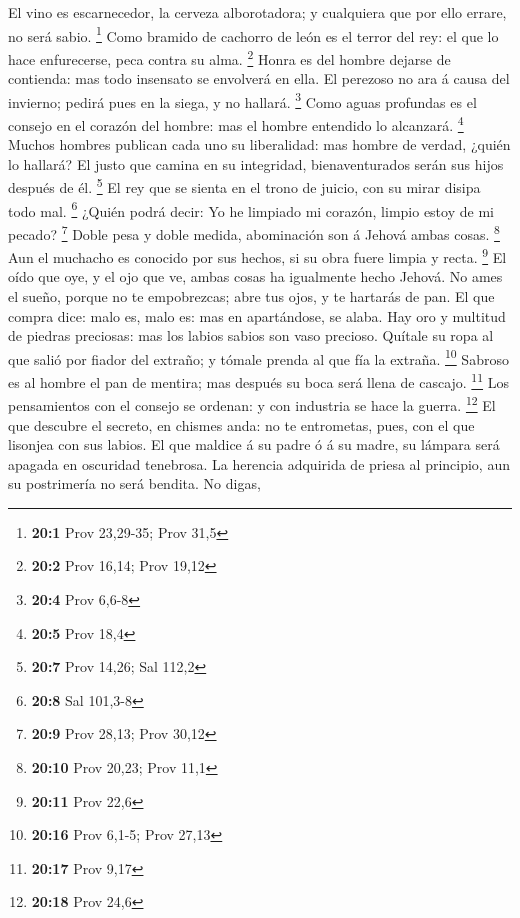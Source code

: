  El vino es escarnecedor, la cerveza alborotadora; y
cualquiera que por ello errare, no será sabio. \footnote{\textbf{20:1}
  Prov 23,29-35; Prov 31,5}  Como bramido de cachorro de
león es el terror del rey: el que lo hace enfurecerse, peca contra su
alma. \footnote{\textbf{20:2} Prov 16,14; Prov 19,12} 
Honra es del hombre dejarse de contienda: mas todo insensato se
envolverá en ella.  El perezoso no ara á causa del
invierno; pedirá pues en la siega, y no hallará. \footnote{\textbf{20:4}
  Prov 6,6-8}  Como aguas profundas es el consejo en el
corazón del hombre: mas el hombre entendido lo alcanzará. \footnote{\textbf{20:5}
  Prov 18,4}  Muchos hombres publican cada uno su
liberalidad: mas hombre de verdad, ¿quién lo hallará?  El
justo que camina en su integridad, bienaventurados serán sus hijos
después de él. \footnote{\textbf{20:7} Prov 14,26; Sal 112,2}
 El rey que se sienta en el trono de juicio, con su mirar
disipa todo mal. \footnote{\textbf{20:8} Sal 101,3-8} 
¿Quién podrá decir: Yo he limpiado mi corazón, limpio estoy de mi
pecado? \footnote{\textbf{20:9} Prov 28,13; Prov 30,12} 
Doble pesa y doble medida, abominación son á Jehová ambas cosas.
\footnote{\textbf{20:10} Prov 20,23; Prov 11,1}  Aun el
muchacho es conocido por sus hechos, si su obra fuere limpia y recta.
\footnote{\textbf{20:11} Prov 22,6}  El oído que oye, y
el ojo que ve, ambas cosas ha igualmente hecho Jehová. 
No ames el sueño, porque no te empobrezcas; abre tus ojos, y te hartarás
de pan.  El que compra dice: malo es, malo es: mas en
apartándose, se alaba.  Hay oro y multitud de piedras
preciosas: mas los labios sabios son vaso precioso. 
Quítale su ropa al que salió por fiador del extraño; y tómale prenda al
que fía la extraña. \footnote{\textbf{20:16} Prov 6,1-5; Prov 27,13}
 Sabroso es al hombre el pan de mentira; mas después su
boca será llena de cascajo. \footnote{\textbf{20:17} Prov 9,17}
 Los pensamientos con el consejo se ordenan: y con
industria se hace la guerra. \footnote{\textbf{20:18} Prov 24,6}
 El que descubre el secreto, en chismes anda: no te
entrometas, pues, con el que lisonjea con sus labios.  El
que maldice á su padre ó á su madre, su lámpara será apagada en
oscuridad tenebrosa.  La herencia adquirida de priesa al
principio, aun su postrimería no será bendita.  No digas,
